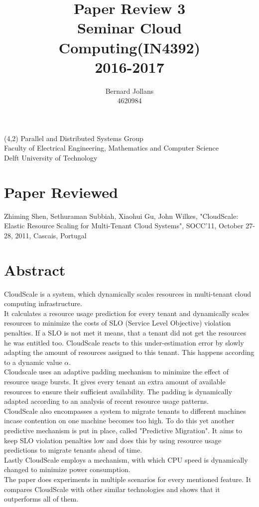 \documentclass[a4paper]{article}
\begin{document}
\begin{textblock}{10}(4,2)
\noindent\footnotesize Parallel and Distributed Systems Group\\
Faculty of Electrical Engineering, Mathematics and Computer Science\\
Delft University of Technology
\end{textblock}
\title{\vspace{-2cm}Paper Review 3\\ Seminar Cloud Computing(IN4392)\\2016-2017}
\author{Bernard Jollans \\ 4620984}
\maketitle

\section{Paper Reviewed}
Zhiming Shen, Sethuraman Subbiah, Xiaohui Gu, John Wilkes,
"CloudScale: Elastic Resource Scaling for
Multi-Tenant Cloud Systems",
SOCC'11, October 27-28, 2011, Cascais, Portugal

\section{Abstract}
CloudScale is a system, which dynamically scales resources in multi-tenant cloud computing infrastructure.\\ It calculates a resource usage prediction for every tenant and dynamically scales resources to minimize the costs of SLO (Service Level Objective) violation penalties. If a SLO is not met it means, that a tenant did not get the resources he was entitled too. CloudScale reacts to this under-estimation error by slowly adapting the amount of resources assigned to this tenant. This happens according to a dynamic value $\alpha$. \\
Cloudscale uses an adaptive padding mechanism to minimize the effect of resource usage bursts. It gives every tenant an extra amount of available resources to ensure their sufficient availability. The padding is dynamically adapted according to an analysis of recent resource usage patterns. \\
CloudScale also encompasses a system to migrate tenants to different machines incase contention on one machine becomes too high. To do this yet another predictive mechanism is put in place, called "Predictive Migration". It aims to keep SLO violation penalties low and does this by using resource usage predictions to migrate tenants ahead of time.\\
Lastly CloudScale employs a mechanism, with which CPU speed is dynamically changed to minimize power consumption.\\
The paper does experiments in multiple scenarios for every mentioned feature. It compares CloudScale with other similar technologies and shows that it outperforms all of them.
\newpage
\end{document}
